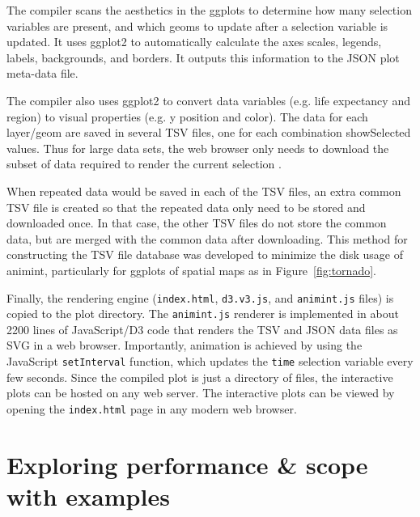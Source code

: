\documentclass[12pt]{article}\usepackage[]{graphicx}\usepackage[]{color}
\begin{document}
The compiler scans the aesthetics in the ggplots to determine
how many selection variables are present, and which geoms to update
after a selection variable is updated. It uses ggplot2 to
automatically calculate the axes scales, legends, labels, backgrounds,
and borders. It outputs this information to the JSON plot meta-data
file.

The compiler also uses ggplot2 to convert data variables (e.g. life
expectancy and region) to visual properties (e.g. y position and
color). The data for each layer/geom are saved in several TSV files,
one for each combination showSelected values. Thus for large data
sets, the web browser only needs to download the subset of data
required to render the current selection \citep{2013-immens}.

When repeated data would be saved in each of the TSV files, an extra
common TSV file is created so that the repeated data only need to be
stored and downloaded once. In that case, the other TSV files do not
store the common data, but are merged with the common data after
downloading. This method for constructing the TSV file database was
developed to minimize the disk usage of animint, particularly
for ggplots of spatial maps as in Figure~\ref{fig:tornado}.

Finally, the rendering engine (\texttt{index.html}, \texttt{d3.v3.js},
and \texttt{animint.js} files) is copied to the plot directory. The
\texttt{animint.js} renderer is implemented in about 2200 lines of
JavaScript/D3 code that renders the TSV and JSON data files as SVG in
a web browser. Importantly, animation is achieved by using the
JavaScript \texttt{setInterval} function, which updates the
\texttt{time} selection variable every few seconds. Since the compiled
plot is just a directory of files, the interactive plots can be hosted
on any web server. The interactive plots can be viewed by opening the
\texttt{index.html} page in any modern web browser.

\section{Exploring performance \& scope with examples}
\label{sec:performance}
\end{document}
